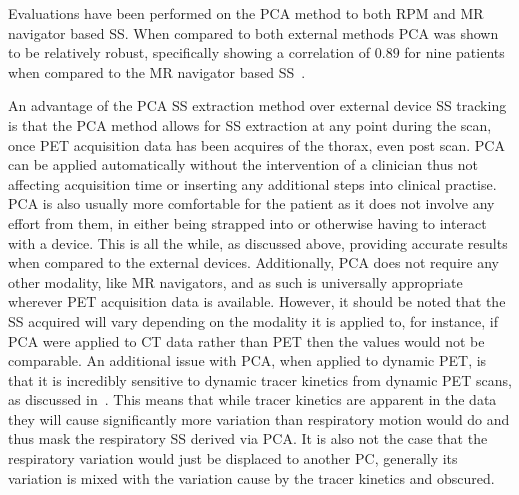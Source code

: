                Evaluations have been performed on the \gls{PCA} method to both \gls{RPM} and \gls{MR} navigator based \gls{SS}. When compared to both external methods \gls{PCA} was shown to be relatively robust, specifically showing a correlation of $0.89$ for nine patients when compared to the \gls{MR} navigator based \gls{SS}~.
                
                An advantage of the \gls{PCA} \gls{SS} extraction method over external device \gls{SS} tracking is that the \gls{PCA} method allows for \gls{SS} extraction at any point during the scan, once \gls{PET} acquisition data has been acquires of the thorax, even post scan. \gls{PCA} can be applied automatically without the intervention of a clinician thus not affecting acquisition time or inserting any additional steps into clinical practise. \gls{PCA} is also usually more comfortable for the patient as it does not involve any effort from them, in either being strapped into or otherwise having to interact with a device. This is all the while, as discussed above, providing accurate results when compared to the external devices. Additionally, \gls{PCA} does not require any other modality, like \gls{MR} navigators, and as such is universally appropriate wherever \gls{PET} acquisition data is available. However, it should be noted that the \gls{SS} acquired will vary depending on the modality it is applied to, for instance, if \gls{PCA} were applied to \gls{CT} data rather than \gls{PET} then the values would not be comparable. An additional issue with \gls{PCA}, when applied to dynamic \gls{PET}, is that it is incredibly sensitive to dynamic tracer kinetics from dynamic \gls{PET} scans, as discussed in~. This means that while tracer kinetics are apparent in the data they will cause significantly more variation than respiratory motion would do and thus mask the respiratory \gls{SS} derived via \gls{PCA}. It is also not the case that the respiratory variation would just be displaced to another \gls{PC}, generally its variation is mixed with the variation cause by the tracer kinetics and obscured.
            
